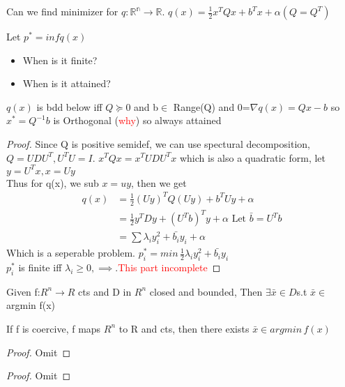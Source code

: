\begin{problem}
  Can we find minimizer for $q:\mathbb{R^n}\rightarrow \mathbb{R}$.
  $q(x)=\frac{1}{2}x^TQx+b^Tx+\alpha(Q=Q^T)$
  
  Let $p^*=inf q(x)$ 
  \begin{itemize}
    \item When is it finite?
    \item When is it attained?
  \end{itemize} 
  
\end{problem}

\begin{proposition}
   $q(x)$ is bdd below iff $Q\succeq 0$ and b$\in$ Range(Q) and 0=$\nabla q(x)=Qx-b$ so $x^*=Q^{-1}b$ is Orthogonal (\textcolor{red}{why}) so always attained


\end{proposition}
\begin{proof}
  Since Q is positive semidef, we can use spectural decomposition,
  $Q=UDU^T,U^TU=I$. $x^TQx=x^TUDU^Tx$ which is also a quadratic form, let $y=U^Tx,x=Uy$
  \\ Thus for q(x), we sub $x=uy$, then we get 
  \begin{align*}
    q(x) &= \frac{1}{2}(Uy)^TQ(Uy)+b^TUy+\alpha \\
    &= \frac{1}{2}y^TDy+(U^Tb)^Ty+\alpha \text{  Let }\bar{b}=U^Tb \\
    &= \sum\lambda_iy_i^2+\bar{b_i}y_i+\alpha
  \end{align*}
  Which is a seperable problem.
  $p_i^*=min\, \frac{1}{2}\lambda_iy_i^2+\bar{b_i}y_i$
  \\ $p_i^*$ is finite iff $\lambda_i \geq 0,\implies . $\textcolor{red}{This part incomplete}
\end{proof}

\begin{theorem}[Weierstrass]
  Given f:$R^n\rightarrow R$ cts and D in $R^n$ closed and bounded,
  Then $\exists\bar{x}\in D$s.t $\bar{x}\in$ argmin f(x)
\end{theorem}

\begin{proposition}
  If f is coercive, f maps $R^n$ to R and cts, then there exists $\bar{x}\in argmin\,f(x)$
\end{proposition}
\begin{proof}
  Omit
\end{proof}

\begin{theorem}
  
\end{theorem}
\begin{proof}
  Omit
\end{proof}